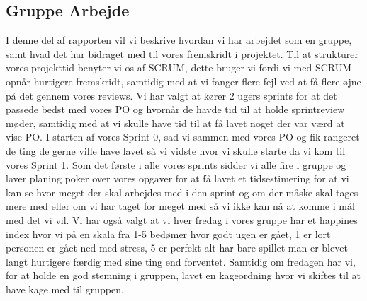 \subsection{Gruppe Arbejde}
I denne del af rapporten vil vi beskrive hvordan vi har arbejdet som en gruppe, samt hvad det har bidraget med til vores fremskridt i projektet. 
Til at strukturer vores projekttid benyter vi os af SCRUM, dette bruger vi fordi vi med SCRUM opnår hurtigere fremskridt, samtidig med at vi fanger flere fejl ved at få flere øjne på det gennem vores reviews. Vi har valgt at kører 2 ugers sprints for at det passede bedst med vores PO og hvornår de havde tid til at holde sprintreview møder, samtidig med at vi skulle have tid til at få lavet noget der var værd at vise PO.
I starten af vores Sprint 0, sad vi sammen med vores PO og fik rangeret de ting de gerne ville have lavet så vi vidste hvor vi skulle starte da vi kom til vores Sprint 1. Som det første i alle vores sprints sidder vi alle fire i gruppe og laver planing poker over vores opgaver for at få lavet et tidsestimering for at vi kan se hvor meget der skal arbejdes med i den sprint og om der måske skal tages mere med eller om vi har taget for meget med så vi ikke kan nå at komme i mål med det vi vil. Vi har også valgt at vi hver fredag i vores gruppe har et happines index hvor vi på en skala fra 1-5 bedømer hvor godt ugen er gået, 1 er lort personen er gået ned med stress, 5 er perfekt alt har bare spillet man er blevet langt hurtigere færdig med sine ting end forventet. Samtidig om fredagen har vi, for at holde en god stemning i gruppen, lavet en kageordning hvor vi skiftes til at have kage med til gruppen.